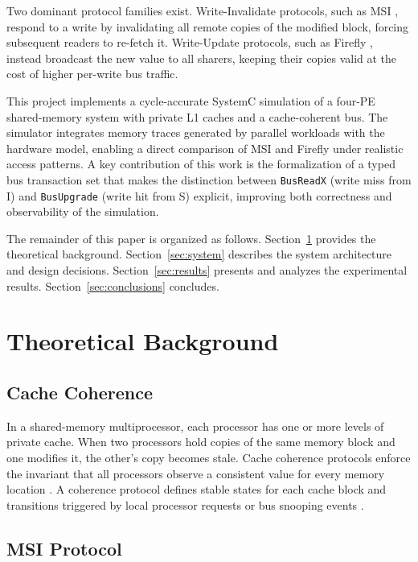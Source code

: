 \documentclass[journal,trans]{IEEEtran}
\begin{document}
Two dominant protocol families exist. Write-Invalidate protocols, such as
MSI \cite{archibald1986cache}, respond to a write by invalidating all remote
copies of the modified block, forcing subsequent readers to re-fetch it.
Write-Update protocols, such as Firefly \cite{thacker1988firefly}, instead
broadcast the new value to all sharers, keeping their copies valid at the
cost of higher per-write bus traffic.
 
This project implements a cycle-accurate SystemC \cite{ieee2024systemc}
simulation of a four-PE shared-memory system with private L1 caches and a
cache-coherent bus. The simulator integrates memory traces generated by parallel
workloads with the hardware model, enabling a direct comparison of MSI and
Firefly under realistic access patterns. A key contribution of this work is the
formalization of a typed bus transaction set that makes the distinction between
\texttt{BusReadX} (write miss from I) and \texttt{BusUpgrade} (write hit from S)
explicit, improving both correctness and observability of the simulation.
 
The remainder of this paper is organized as follows. Section~\ref{sec:theory}
provides the theoretical background. Section~\ref{sec:system} describes the
system architecture and design decisions. Section~\ref{sec:results} presents
and analyzes the experimental results. Section~\ref{sec:conclusions} concludes.

\section{Theoretical Background}
\label{sec:theory}
 
\subsection{Cache Coherence}
 
In a shared-memory multiprocessor, each processor has one or more levels of
private cache. When two processors hold copies of the same memory block and one
modifies it, the other's copy becomes stale. Cache coherence protocols enforce
the invariant that all processors observe a consistent value for every memory
location \cite{hennessy2017computer, nagarajan2020primer}. A coherence protocol
defines stable states for each cache block and transitions triggered by local
processor requests or bus snooping events \cite{solihin2016fundamentals}.
 
\subsection{MSI Protocol}
 
\end{document}
